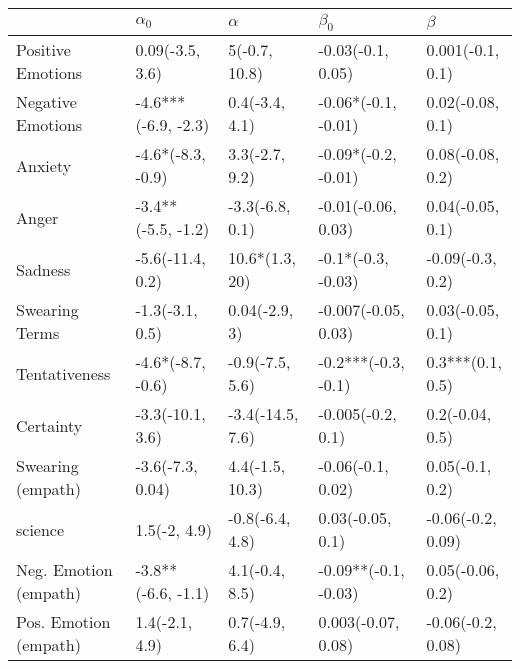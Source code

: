 \begin{tabular}{lllll}
\toprule
{} &           $\alpha_0$ &          $\alpha$ &             $\beta_0$ &            $\beta$ \\
\midrule
Positive Emotions     &      0.09(-3.5, 3.6) &     5(-0.7, 10.8) &     -0.03(-0.1, 0.05) &   0.001(-0.1, 0.1) \\
Negative Emotions     &  -4.6***(-6.9, -2.3) &    0.4(-3.4, 4.1) &   -0.06*(-0.1, -0.01) &   0.02(-0.08, 0.1) \\
Anxiety               &    -4.6*(-8.3, -0.9) &    3.3(-2.7, 9.2) &   -0.09*(-0.2, -0.01) &   0.08(-0.08, 0.2) \\
Anger                 &   -3.4**(-5.5, -1.2) &   -3.3(-6.8, 0.1) &    -0.01(-0.06, 0.03) &   0.04(-0.05, 0.1) \\
Sadness               &     -5.6(-11.4, 0.2) &    10.6*(1.3, 20) &    -0.1*(-0.3, -0.03) &   -0.09(-0.3, 0.2) \\
Swearing Terms        &      -1.3(-3.1, 0.5) &     0.04(-2.9, 3) &   -0.007(-0.05, 0.03) &   0.03(-0.05, 0.1) \\
Tentativeness         &    -4.6*(-8.7, -0.6) &   -0.9(-7.5, 5.6) &   -0.2***(-0.3, -0.1) &   0.3***(0.1, 0.5) \\
Certainty             &     -3.3(-10.1, 3.6) &  -3.4(-14.5, 7.6) &     -0.005(-0.2, 0.1) &    0.2(-0.04, 0.5) \\
Swearing (empath)     &     -3.6(-7.3, 0.04) &   4.4(-1.5, 10.3) &     -0.06(-0.1, 0.02) &    0.05(-0.1, 0.2) \\
science               &         1.5(-2, 4.9) &   -0.8(-6.4, 4.8) &      0.03(-0.05, 0.1) &  -0.06(-0.2, 0.09) \\
Neg. Emotion (empath) &   -3.8**(-6.6, -1.1) &    4.1(-0.4, 8.5) &  -0.09**(-0.1, -0.03) &   0.05(-0.06, 0.2) \\
Pos. Emotion (empath) &       1.4(-2.1, 4.9) &    0.7(-4.9, 6.4) &    0.003(-0.07, 0.08) &  -0.06(-0.2, 0.08) \\
\bottomrule
\end{tabular}
